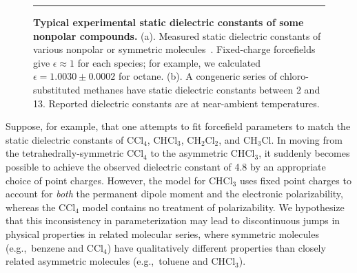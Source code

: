 \documentclass[journal=jacsat,manuscript=article]{achemso}
\begin{document}
\begin{figure}


\noindent\rule{8cm}{0.4pt}


\caption{{\bf Typical experimental static dielectric constants of some nonpolar compounds.}
(a). Measured static dielectric constants of various nonpolar or symmetric molecules~\cite{d1990dielectric, haynes2011crc}.  
Fixed-charge forcefields give $\epsilon \approx 1$ for each species; for example, we calculated $\epsilon = 1.0030 \pm 0.0002$ for octane.
(b).  A congeneric series of chloro-substituted methanes have static dielectric constants between 2 and 13.  
Reported dielectric constants are at near-ambient temperatures.  
}
\label{figure:nonpolars}

\end{figure}


Suppose, for example, that one attempts to fit forcefield parameters to match the static dielectric constants of $\mathrm{CCl_4}$, $\mathrm{CHCl_3}$, $\mathrm{CH_2Cl_2}$, and $\mathrm{CH_3Cl}$.
In moving from the tetrahedrally-symmetric $\mathrm{CCl_4}$ to the asymmetric $\mathrm{CHCl_3}$, it suddenly becomes possible to achieve the observed dielectric constant of 4.8 by an appropriate choice of point charges.
However, the model for $\mathrm{CHCl_3}$ uses fixed point charges to account for \emph{both} the permanent dipole moment and the electronic polarizability, whereas the $\mathrm{CCl_4}$ model contains no treatment of polarizability.  
We hypothesize that this inconsistency in parameterization may lead to discontinuous jumps in physical properties in related molecular series, where symmetric molecules (e.g.,~benzene and $\mathrm{CCl_4}$) have qualitatively different properties than closely related asymmetric molecules (e.g.,~toluene and $\mathrm{CHCl_3}$).
\end{document}
